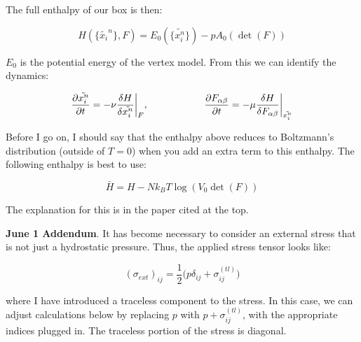 \documentclass[12pt]{article}
\begin{document}
The full enthalpy of our box is then:
\begin{center}
\begin{equation}
\label{eqn: enthalpy}
H(\{\tilde{x_i}^n\}, F) = E_0(\{\tilde{x_i^n}\}) - p A_0 (\det(F))
\end{equation}
\end{center}
$E_0$ is the potential energy of the vertex model. From this we can identify the dynamics:
\begin{center}
\begin{equation}
\label{eqn: dyn}
\pdv{\tilde{x_i^n}}{t} = -\nu \fdv{H}{\tilde{x_i^n}}\bigg\vert_{F}, \hspace{2cm} \pdv{F_{\alpha \beta}}{t} = -\mu \fdv{H}{F_{\alpha\beta}}\bigg\vert_{\tilde{x_i^n}}
\end{equation}
\end{center}
Before I go on, I should say that the enthalpy above reduces to Boltzmann's distribution (outside of $T = 0$) when you add an extra term to this enthalpy. The following enthalpy is best to use:
\begin{center}
\begin{equation}
\bar{H} = H - N k_B T \log(V_0 \det(F))
\end{equation}
\end{center}
The explanation for this is in the paper cited at the top.

\textbf{June 1 Addendum}. It has become necessary to consider an external stress that is not just a hydrostatic pressure. Thus, the applied stress tensor looks like:

\begin{center}
\begin{equation}
\label{eqn: hydrostatic_stress}
(\sigma_{ext})_{ij} = \frac{1}{2}\bigg( p \delta_{ij} + \sigma^{(tl)}_{ij}\bigg)
\end{equation}
\end{center}

where I have introduced a traceless component to the stress. In this case, we can adjust calculations below by replacing $p$ with $p + \sigma^{(tl)}_{ij}$, with the appropriate indices plugged in. The traceless portion of the stress is diagonal.
\end{document}
